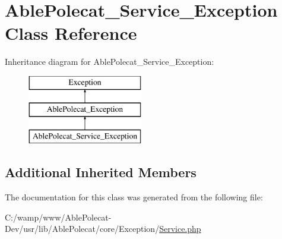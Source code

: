\hypertarget{class_able_polecat___service___exception}{}\section{Able\+Polecat\+\_\+\+Service\+\_\+\+Exception Class Reference}
\label{class_able_polecat___service___exception}
Inheritance diagram for Able\+Polecat\+\_\+\+Service\+\_\+\+Exception\+:\begin{figure}[H]
\begin{center}
\leavevmode
\includegraphics[height=3.000000cm]{class_able_polecat___service___exception}
\end{center}
\end{figure}
\subsection*{Additional Inherited Members}


The documentation for this class was generated from the following file\+:\begin{DoxyCompactItemize}
\item 
C\+:/wamp/www/\+Able\+Polecat-\/\+Dev/usr/lib/\+Able\+Polecat/core/\+Exception/\hyperlink{_exception_2_service_8php}{Service.\+php}\end{DoxyCompactItemize}
